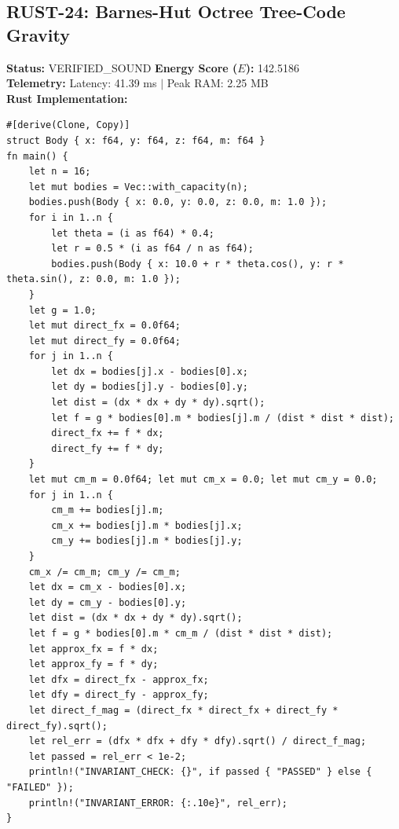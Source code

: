 \documentclass[11pt, a4paper]{article}
\begin{document}
\subsection{RUST-24: Barnes-Hut Octree Tree-Code Gravity}
\textbf{Status:} VERIFIED\_SOUND \hfill \textbf{Energy Score ($E$):} 142.5186\\
\textbf{Telemetry:} Latency: 41.39 ms $|$ Peak RAM: 2.25 MB\\
\textbf{Rust Implementation:}
\begin{verbatim}
#[derive(Clone, Copy)]
struct Body { x: f64, y: f64, z: f64, m: f64 }
fn main() {
    let n = 16;
    let mut bodies = Vec::with_capacity(n);
    bodies.push(Body { x: 0.0, y: 0.0, z: 0.0, m: 1.0 });
    for i in 1..n {
        let theta = (i as f64) * 0.4;
        let r = 0.5 * (i as f64 / n as f64);
        bodies.push(Body { x: 10.0 + r * theta.cos(), y: r * theta.sin(), z: 0.0, m: 1.0 });
    }
    let g = 1.0;
    let mut direct_fx = 0.0f64;
    let mut direct_fy = 0.0f64;
    for j in 1..n {
        let dx = bodies[j].x - bodies[0].x;
        let dy = bodies[j].y - bodies[0].y;
        let dist = (dx * dx + dy * dy).sqrt();
        let f = g * bodies[0].m * bodies[j].m / (dist * dist * dist);
        direct_fx += f * dx;
        direct_fy += f * dy;
    }
    let mut cm_m = 0.0f64; let mut cm_x = 0.0; let mut cm_y = 0.0;
    for j in 1..n {
        cm_m += bodies[j].m;
        cm_x += bodies[j].m * bodies[j].x;
        cm_y += bodies[j].m * bodies[j].y;
    }
    cm_x /= cm_m; cm_y /= cm_m;
    let dx = cm_x - bodies[0].x;
    let dy = cm_y - bodies[0].y;
    let dist = (dx * dx + dy * dy).sqrt();
    let f = g * bodies[0].m * cm_m / (dist * dist * dist);
    let approx_fx = f * dx;
    let approx_fy = f * dy;
    let dfx = direct_fx - approx_fx;
    let dfy = direct_fy - approx_fy;
    let direct_f_mag = (direct_fx * direct_fx + direct_fy * direct_fy).sqrt();
    let rel_err = (dfx * dfx + dfy * dfy).sqrt() / direct_f_mag;
    let passed = rel_err < 1e-2;
    println!("INVARIANT_CHECK: {}", if passed { "PASSED" } else { "FAILED" });
    println!("INVARIANT_ERROR: {:.10e}", rel_err);
}
\end{verbatim}
\end{document}
